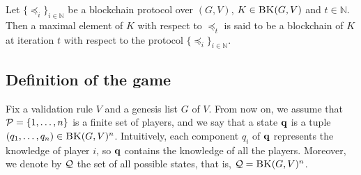 %


\begin{mydef}
	Let $\{ \preceq_i\}_{i \in \mathbb{N}}$ be a blockchain protocol over $(G,V)$, $K \in \text{\sc BK}(G,V)$ and $t \in \mathbb{N}$. 
	Then a maximal element of $K$ with respect to $\preceq_t$ is said to be a blockchain of $K$ at iteration $t$ with respect to the protocol $\{ \preceq_i\}_{i \in \mathbb{N}}$.
\end{mydef}




\subsection{Definition of the game}
Fix a validation rule $V$ and a genesis list $G$ of $V$. From now on, we assume that $\mathcal{P} = \{1, \ldots, n\}$ is a finite set of players, and we say that a state $\mathbf{q}$ is a tuple $(q_1, \ldots, q_n) \in \text{\sc BK}(G,V)^n$. Intuitively, each component $q_i$ of $\mathbf{q}$ represents the knowledge of player $i$, so $\mathbf{q}$ contains the knowledge of all the players. Moreover, we denote by $\mathcal{Q}$ the set of all possible states, that is, $\mathcal{Q} = \text{\sc BK}(G,V)^n$.


